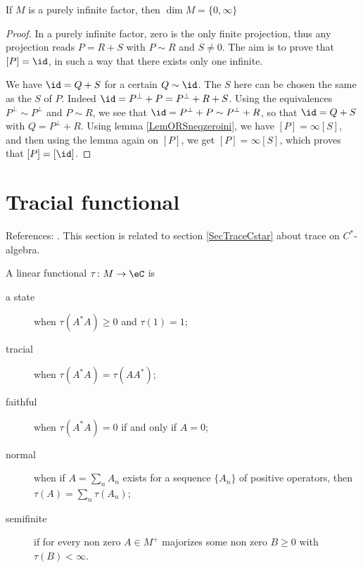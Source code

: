 \begin{corollary}
If $M$ is a purely infinite factor, then $\dim M=\{ 0,\infty \}$
\end{corollary}

\begin{proof}
In a purely infinite factor, zero is the only finite projection, thus any projection reads $P=R+S$ with $P\sim R$ and $S\neq 0$. The aim is to prove that $[P]=\id$, in such a way that there exists only one infinite.

We have $\id=Q+S$ for a certain $Q\sim \id$. The $S$ here can be chosen the same as the $S$ of $P$. Indeed $\id=P^{\perp}+P=P^{\perp}+R+S$. Using the equivalences $P^{\perp}\sim P^{\perp}$ and $P\sim R$, we see that $\id=P^{\perp}+P\sim P^{\perp}+R$, so that $\id=Q+S$ with $Q=P^{\perp}+R$. Using lemma \ref{LemORSneqzeroini}, we have $[P]=\infty[S]$, and then using the lemma again on $[P]$, we get $[P]=\infty[S]$, which proves that $[P]=[\id]$.
\end{proof}

					\section{Tracial functional}
\label{SecTracevonNeuman}

References: \cite{DixmierTrace,TrioloSemifinite}. This section is related to section \ref{SecTraceCstar} about trace on $C^*$-algebra.

A linear functional $\tau\colon M\to \eC$ is
\begin{description}
	\item[a state] when $\tau(A^*A)\geq0$ and $\tau(1)=1$;
	\item[tracial] when $\tau(A^*A)=\tau(AA^*)$;
	\item[faithful] when $\tau(A^*A)=0$ if and only if $A=0$;
	\item[normal] when if $A=\sum_n A_n$ exists for a sequence $\{ A_n \}$ of positive operators, then $\tau(A)=\sum_n\tau(A_n)$;
	\item[semifinite] if for every non zero $A\in M^+$ majorizes some non zero $B\geq 0$ with $\tau(B)<\infty$.
\end{description}

